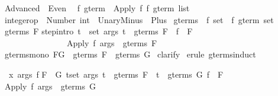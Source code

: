 %
\begin{isabellebody}%
\def\isabellecontext{Advanced}%
%
\isadelimtheory
\isanewline
%
\endisadelimtheory
%
\isatagtheory
\isamarkupfalse%
\ Advanced\ \ Even\ %
\endisatagtheory
{\isafoldtheory}%
%
\isadelimtheory
\isanewline
%
\endisadelimtheory
\isanewline
\isanewline
\isamarkupfalse%
\ {\isacharprime}f\ gterm\ {\isacharequal}\ Apply\ {\isacharprime}f\ {\isachardoublequote}{\isacharprime}f\ gterm\ list{\isachardoublequote}\isanewline
\isanewline
\isamarkupfalse%
\ integer{\isacharunderscore}op\ {\isacharequal}\ Number\ int\ {\isacharbar}\ UnaryMinus\ {\isacharbar}\ Plus\isanewline
\isanewline
\isamarkupfalse%
\ gterms\ {\isacharcolon}{\isacharcolon}\ {\isachardoublequote}{\isacharprime}f\ set\ {\isasymRightarrow}\ {\isacharprime}f\ gterm\ set{\isachardoublequote}\isanewline
\isamarkupfalse%
\ {\isachardoublequote}gterms\ F{\isachardoublequote}\isanewline
{}\isanewline
step{\isacharbrackleft}intro{\isacharbang}{\isacharbrackright}{\isacharcolon}\ {\isachardoublequote}{\isasymlbrakk}{\isasymforall}t\ {\isasymin}\ set\ args{\isachardot}\ t\ {\isasymin}\ gterms\ F{\isacharsemicolon}\ \ f\ {\isasymin}\ F{\isasymrbrakk}\isanewline
\ \ \ \ \ \ \ \ \ \ \ \ \ \ \ {\isasymLongrightarrow}\ {\isacharparenleft}Apply\ f\ args{\isacharparenright}\ {\isasymin}\ gterms\ F{\isachardoublequote}\isanewline
\isanewline
\isamarkupfalse%
\ gterms{\isacharunderscore}mono{\isacharcolon}\ {\isachardoublequote}F{\isasymsubseteq}G\ {\isasymLongrightarrow}\ gterms\ F\ {\isasymsubseteq}\ gterms\ G{\isachardoublequote}\isanewline
%
\isadelimproof
%
\endisadelimproof
%
\isatagproof
\isamarkupfalse%
\ clarify\isanewline
\isamarkupfalse%
\ {\isacharparenleft}erule\ gterms{\isachardot}induct{\isacharparenright}\isamarkuptrue%
%
\begin{isamarkuptxt}%
\begin{isabelle}%
\ {}{\isachardot}\ {\isasymAnd}x\ args\ f{\isachardot}\isanewline
{}F\ {\isasymsubseteq}\ G{\isacharsemicolon}\ {\isasymforall}t{\isasymin}set\ args{\isachardot}\ t\ {\isasymin}\ gterms\ F\ {\isasymand}\ t\ {\isasymin}\ gterms\ G{\isacharsemicolon}\ f\ {\isasymin}\ F{\isasymrbrakk}\isanewline
{}\ Apply\ f\ args\ {\isasymin}\ gterms\ G%
\end{isabelle}%

\end{isamarkuptxt}
\end{isabellebody}
